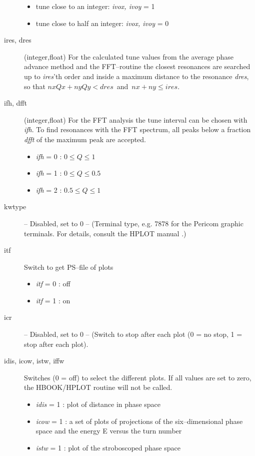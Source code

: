 \begin{description}
 \begin{itemize}
 \item tune close to an integer: {\em ivox, ivoy} \/= 1
 \item tune close to half an integer: {\em ivox, ivoy} \/= 0
 \end {itemize}
\item [ires, dres] (integer,float) For the calculated tune values from
  the average phase advance method and the FFT--routine the closest
  resonances are searched up to {\em ires}\/'th order and inside a
  maximum distance to the resonance {\em dres}\/, so that \mbox{$ nx
    Qx + ny Qy < dres $ and $ nx + ny \le ires $.}
\item [ifh, dfft] (integer,float) For the FFT analysis the tune
  interval can be chosen with {\em ifh}\/.  To find resonances with
  the FFT spectrum, all peaks below a fraction {\em dfft} \/of the
  maximum peak are accepted.
 \begin{itemize}
 \item {\em ifh} \/= 0 : $ 0 \le Q \le 1 $
 \item {\em ifh} \/= 1 : $ 0 \le Q \le 0.5 $
 \item {\em ifh} \/= 2 : $ 0.5 \le Q \le 1 $
 \end{itemize}
\item [kwtype] {\large -- Disabled, set to 0 --} ({\small Terminal
    type, e.g. 7878 for the Pericom graphic terminals. For details,
    consult the HPLOT manual \cite{HPLOT}.})
\item [itf] Switch to get PS--file of plots
  \begin{itemize}
  \item {\em itf} = 0 : off
  \item {\em itf} = 1 : on
  \end{itemize}
\item [icr] {\large -- Disabled, set to 0 --} ({\small Switch to stop
    after each plot (0 = no stop, 1 = stop after each plot).}
\item [idis, icow, istw, iffw] Switches (0 = off) to select the
  different plots. If all values are set to zero, the HBOOK/HPLOT
  routine will not be called.
  \begin{itemize}
  \item {\em idis} \/= 1 : plot of distance in phase space
  \item {\em icow} \/= 1 : a set of plots of projections of the
    six--dimensional phase space and the energy E versus the turn
    number
  \item {\em istw} \/= 1 : plot of the stroboscoped phase space

\end{itemize}
\end{description}

